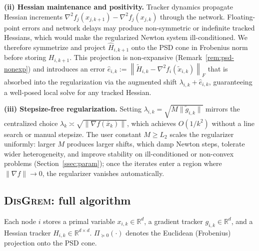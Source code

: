 \documentclass[11pt,a4paper]{article}
\def\cO{O}%
\newcommand{\R}{\mathbb{R}}
\newcommand{\normF}[1]{\left\|#1\right\|_F}
\newcommand{\cO}{\mathcal{O}}
\newcommand{\ProjPSD}{\Pi_{\succeq 0}}
\begin{document}
	\textbf{(ii) Hessian maintenance and positivity.}
	Tracker dynamics propagate Hessian increments $\nabla^2 f_j(x_{j,k+1})-\nabla^2 f_j( x_{j,k})$
	through the network.
	Floating-point errors and network delays may produce non-symmetric or indefinite tracked Hessians,
	which would make the regularized Newton system ill-conditioned.
	We therefore symmetrize and project $\widehat H_{i,k+1}$ onto the PSD cone in Frobenius norm
	before storing $H_{i,k+1}$.
	This projection is non-expansive (Remark~\ref{rem:psd-nonexp}) and introduces an error
	$\hat e_{i,k}:=\normF{\tilde H_{i,k}-\nabla^2 f_i(\tilde x_{i,k})}$ that is absorbed into
	the regularization via the augmented shift $\lambda_{i,k}+\hat e_{i,k}$,
	guaranteeing a well-posed local solve for any tracked Hessian.
	
	\textbf{(iii) Stepsize-free regularization.}
	Setting $\lambda_{i,k}=\sqrt{M\|\tilde g_{i,k}\|}$ mirrors the centralized choice
	$\lambda_k\asymp\sqrt{\|\nabla f(\bar x_k)\|}$, which achieves $\cO(1/k^2)$ without a line search
	or manual stepsize.
	The user constant $M\ge L_2$ scales the regularizer uniformly: larger $M$ produces larger shifts,
	which damp Newton steps, tolerate wider heterogeneity, and improve stability on
	ill-conditioned or non-convex problems (Section~\ref{ssec:param});
	once the iterates enter a region where $\|\nabla f\|\to 0$, the regularizer vanishes automatically.
	
	\subsection{\textsc{DisGrem}: full algorithm}\label{ssec:disgrem}
	
	Each node $i$ stores a primal variable $x_{i,k}\in\R^d$, a gradient tracker $g_{i,k}\in\R^d$,
	and a Hessian tracker $H_{i,k}\in\R^{d\times d}$.
	$\ProjPSD(\cdot)$ denotes the Euclidean (Frobenius) projection onto the PSD cone.
	
\end{document}
